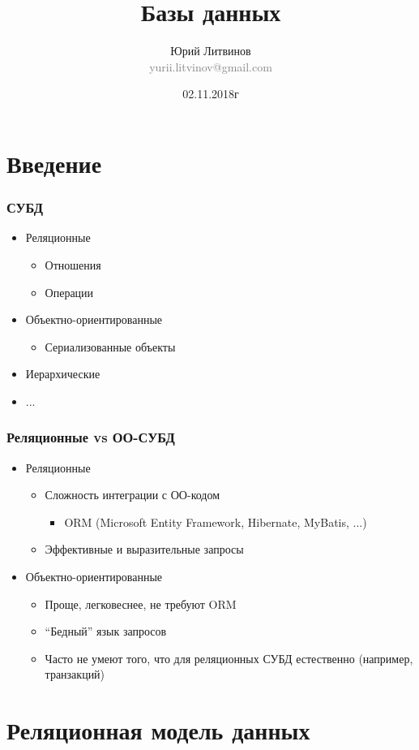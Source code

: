 \documentclass[xetex,mathserif,serif]{beamer}
\title{Базы данных}
\author[Юрий Литвинов]{Юрий Литвинов\\\small{\textcolor{gray}{yurii.litvinov@gmail.com}}}
\date{02.11.2018г}
\begin{document}
	\frame{\titlepage}

	\section{Введение}

	\begin{frame}
		\frametitle{СУБД}
		\begin{itemize}
			\item Реляционные
			\begin{itemize}
				\item Отношения
				\item Операции
			\end{itemize}
			\item Объектно-ориентированные
			\begin{itemize}
				\item Сериализованные объекты
			\end{itemize}
			\item Иерархические
			\item ...
		\end{itemize}
	\end{frame}

	\begin{frame}
		\frametitle{Реляционные vs ОО-СУБД}
		\begin{itemize}
			\item Реляционные
			\begin{itemize}
				\item Сложность интеграции с ОО-кодом
				\begin{itemize}
					\item ORM (Microsoft Entity Framework, Hibernate, MyBatis, ...)
				\end{itemize}
				\item Эффективные и выразительные запросы
			\end{itemize}
			\item Объектно-ориентированные
			\begin{itemize}
				\item Проще, легковеснее, не требуют ORM
				\item ``Бедный'' язык запросов
				\item Часто не умеют того, что для реляционных СУБД естественно (например, транзакций)
			\end{itemize}
		\end{itemize}
	\end{frame}

	\section{Реляционная модель данных}
\end{document}

